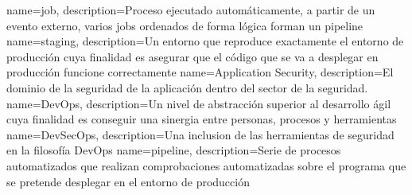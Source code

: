 {
        name=job,
        description={Proceso ejecutado automáticamente, a partir de un evento externo, varios jobs ordenados de forma lógica forman un pipeline}
}
{
        name=staging,
        description={Un entorno que reproduce exactamente el entorno de producción cuya finalidad es asegurar que el código que se va a desplegar en producción funcione correctamente}
}
{
        name=Application Security,
        description={El dominio de la seguridad de la aplicación dentro del 
        sector de la seguridad.}
}
{
        name=DevOps,
        description={Un nivel de abstracción superior al desarrollo ágil cuya
        finalidad es conseguir una sinergia entre personas, procesos y
        herramientas}
}
{
        name=DevSecOps,
        description={Una inclusion de las herramientas de seguridad en la
        filosofía DevOps}
}
{
        name=pipeline,
        description={Serie de procesos automatizados que realizan comprobaciones automatizadas sobre el programa que se pretende desplegar en el entorno de producción}
}

